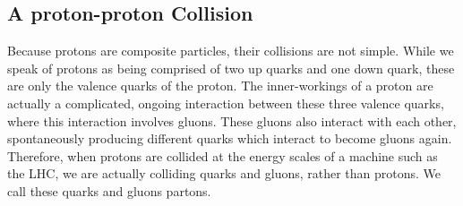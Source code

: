 \vspace{5mm}

\subsection{A proton-proton Collision}

Because protons are composite particles, their collisions are not simple. While we speak of protons as being comprised of two up quarks and one down quark, these are only the valence quarks of the proton. The inner-workings of a proton are actually a complicated, ongoing interaction between these three valence quarks, where this interaction involves gluons. These gluons also interact with each other, spontaneously producing different quarks which interact to become gluons again. Therefore, when protons are collided at the energy scales of a machine such as the LHC, we are actually colliding quarks and gluons, rather than protons. We call these quarks and gluons partons.


